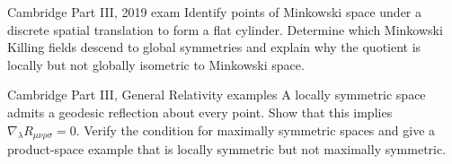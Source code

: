 \begin{exercise}{Cambridge Part III, 2019 exam}
Identify points of Minkowski space under a discrete spatial translation to
form a flat cylinder.  Determine which Minkowski Killing fields descend to
global symmetries and explain why the quotient is locally but not globally
isometric to Minkowski space.
\end{exercise}

\begin{exercise}{Cambridge Part III, General Relativity examples}
A locally symmetric space admits a geodesic reflection about every point.
Show that this implies \(\nabla_\lambda R_{\mu\nu\rho\sigma}=0\).  Verify the
condition for maximally symmetric spaces and give a product-space example
that is locally symmetric but not maximally symmetric.
\end{exercise}
